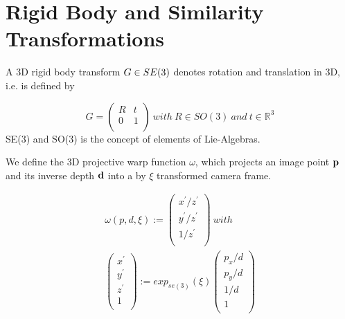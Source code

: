 \section{Rigid Body and Similarity Transformations}
A 3D rigid body transform $G{\rm{ }} \in {\rm{ }}SE(3)$  denotes rotation and translation in 3D,  i.e. is defined by

\begin{equation}
G=\left(
    \begin{array}{cc}
      R & t \\
      0 & 1 \\
    \end{array}
  \right)
    \ with
    \ R\in SO(3)
    \ and
    \ t\in {\mathbb{R}}^{3}
\end{equation}
SE(3) and SO(3) is the concept of elements of Lie-Algebras.

We define the 3D projective warp function $\omega $, which projects an image point ${\bf{p}}$ and its inverse depth ${\bf{d}}$ into a by $\xi $ transformed camera frame.

\begin{equation}
\begin{split}
\omega(p,d,\xi):= \left(
                     \begin{array}{c}
                       x^{'}/z^{'} \\
                       y^{'}/z^{'} \\
                       1/z^{'} \\
                     \end{array}
                   \right) \ with \\
                   \left(
                     \begin{array}{c}
                       x^{'} \\
                       y^{'} \\
                       z^{'} \\
                       1 \\
                     \end{array}
                   \right):=\!exp_{\!se(\!3\!)}(\xi)
                   \left(
                     \begin{array}{c}
                       p_{x}/d \\
                       p_{y}/d  \\
                       1/d  \\
                       1 \\
                     \end{array}
                   \right)
\end{split}
\end{equation}

